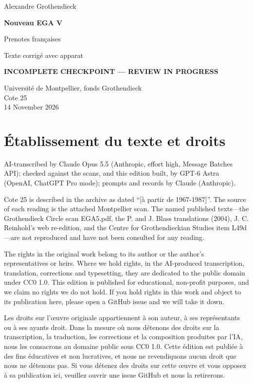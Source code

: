 \documentclass[10pt,a4paper]{article}
\newcommand{\EditionForm}{Texte corrigé avec apparat}
\begin{document}
\hypersetup{pageanchor=false}\begin{titlepage}\thispagestyle{empty}\vspace*{20mm}
{\Large Alexandre Grothendieck\par}\vspace{12mm}
{\Huge\bfseries Nouveau EGA V\par}\vspace{8mm}
{\Large Prenotes françaises\par}\vspace{7mm}
{\large\EditionForm\par}\vspace{12mm}
{\large\bfseries\color{deletedred}INCOMPLETE CHECKPOINT — REVIEW IN PROGRESS\par}\vspace{10mm}
Université de Montpellier, fonds Grothendieck\\ Cote 25\\
14 November 2026
\vfill\end{titlepage}\clearpage\hypersetup{pageanchor=true}
\section*{Établissement du texte et droits}
AI-transcribed by Claude Opus 5.5 (Anthropic, effort high, Message Batches API); checked against the scans, and this edition built, by GPT-6 Astra (OpenAI, ChatGPT Pro mode); prompts and records by Claude (Anthropic).

Cote 25 is described in the archive as dated ``[à partir de 1967-1987]''. The source of each reading is the attached Montpellier scan. The named published texts---the Grothendieck Circle scan EGA5.pdf, the P. and J. Blass translations (2004), J. C. Reinhold's web re-edition, and the Centre for Grothendieckian Studies item L49d---are not reproduced and have not been consulted for any reading.

The rights in the original work belong to its author or the author's representatives or heirs. Where we hold rights, in the AI-produced transcription, translation, corrections and typesetting, they are dedicated to the public domain under CC0 1.0. This edition is published for educational, non-profit purposes, and we claim no rights we do not hold. If you hold rights in this work and object to its publication here, please open a GitHub issue and we will take it down.

Les droits sur l'œuvre originale appartiennent à son auteur, à ses représentants ou à ses ayants droit. Dans la mesure où nous détenons des droits sur la transcription, la traduction, les corrections et la composition produites par l'IA, nous les consacrons au domaine public sous CC0 1.0. Cette édition est publiée à des fins éducatives et non lucratives, et nous ne revendiquons aucun droit que nous ne détenons pas. Si vous détenez des droits sur cette œuvre et vous opposez à sa publication ici, veuillez ouvrir une issue GitHub et nous la retirerons.
\end{document}
